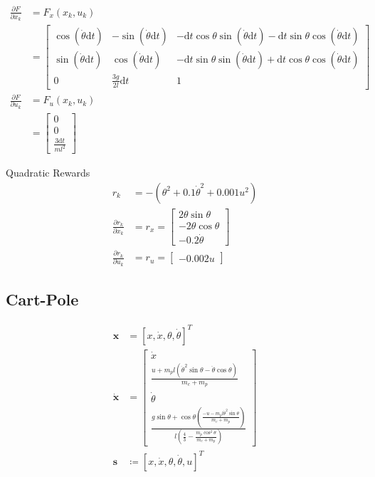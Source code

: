 \documentclass{article}
\theoremstyle{definition} %
\begin{document}
\begin{align*}
    \frac{\partial F}{\partial x_k} 
    &= F_x(x_k, u_k)\\
    &= 
    \left[
        \begin{array}{ccc}
        \cos (\dot{\theta} \mathrm{d}t) & -\sin (\dot{\theta} \mathrm{d}t) & -\mathrm{d}t \cos \theta \sin (\dot{\theta} \mathrm{d}t)-\mathrm{d}t \sin \theta \cos (\dot{\theta} \mathrm{d}t) \\
        \sin (\dot{\theta} \mathrm{d}t) & \cos (\dot{\theta} \mathrm{d}t) & -\mathrm{d}t \sin \theta \sin (\dot{\theta} \mathrm{d}t)+\mathrm{d}t \cos \theta \cos (\dot{\theta} \mathrm{d}t) \\
        0 & \frac{3 g}{2 l} \mathrm{d}t & 1
        \end{array}
    \right]\\
    \frac{\partial F}{\partial u_k} 
    &= F_u(x_k, u_k) \\
    &= 
    \left[\begin{array}{c}0\\0\\\frac{3\mathrm{d}t}{ml^2}\end{array}\right]
\end{align*}

Quadratic Rewards
\begin{align*}
    r_k 
    &= - (\theta^2 + 0.1 \dot{\theta}^2 + 0.001 u^2)\\
    \frac{\partial r_k}{\partial x_k}
    &= r_x = 
    \begin{bmatrix}
        2\theta\sin\theta\\-2\theta\cos\theta\\-0.2\dot{\theta}
    \end{bmatrix}\\
    \frac{\partial r_k}{\partial u_k}
    &= r_u =
    \begin{bmatrix}
        -0.002u
    \end{bmatrix}
\end{align*}

\subsection*{Cart-Pole}

\begin{align*}
    \mathbf x 
    &= [x, \dot{x}, \theta, \dot{\theta}]^T\\
    \dot{\mathbf{x}} 
    &= 
    \begin{bmatrix}
        \dot{x}\\
        \frac{u+m_p l\left(\dot{\theta}^2 \sin \theta-\ddot{\theta} \cos \theta\right)}{m_c+m_p}\\
        \dot{\theta}\\
        \frac{g \sin \theta+\cos \theta\left(\frac{-u-m_p l \dot{\theta}^2 \sin \theta}{m_c+m_p}\right)}{l\left(\frac{4}{3}-\frac{m_p \cos ^2 \theta}{m_c+m_p}\right)}
    \end{bmatrix}\\
    \mathbf{s} &\coloneqq [x, \dot{x}, \theta, \dot{\theta}, u]^T
\end{align*}
\end{document}
